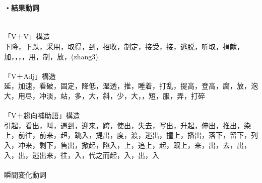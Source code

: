 \paragraph{・結果動詞}　\\
「V＋V」構造\\
下降，下跌，采用，取得，到，招收，制定，接受，接，逃脱，听取，捐献，加，，，，用，制，放，(zhang3)\\
\\
「V＋Adj」構造\\
延，加速，看破，固定，降低，湿透，推，睡着，打乱，提高，登高，腐，放，泡大，用尽，冲淡，站，多，大，斜，少，大，，短，服，弄，打碎\\
\\
「V＋趨向補助語」構造\\
引起，看出，叫，遇到，迎来，跨，使出，失去，写出，升起，伸出，推出，染上，前往，前来，超，跳入，提出，度，渡，逃出，撞上，播出，落下，留下，列入，冲来，剩下，售出，掀起，陷入，上，追上，起，跟上，来，出，去，出，入，出，逃出来，往，入，代之而起，入，出，入\\
\\
瞬間変化動詞\\
